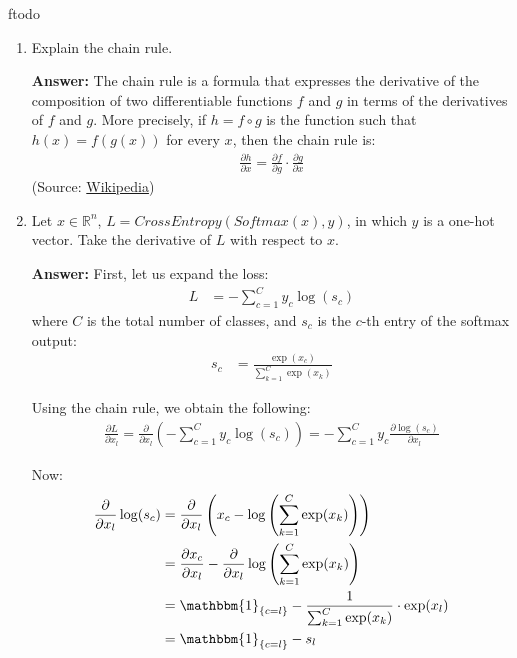 ƒtodo\documentclass{article}
\newenvironment{QandA}{\begin{enumerate}[label=\arabic*.]}{\end{enumerate}}
\newenvironment{answer}{\par\normalfont \textbf{Answer:}}{}
\newcommand{\R}{\mathbb{R}}
\newcommand{\Indicator}[1]{\mathbbm{1}_{\left\{ #1 \right\}}}
\begin{document}
\begin{QandA}
    \item Explain the chain rule.
    \begin{answer}
        The chain rule is a formula that expresses the derivative of the composition of two differentiable functions $f$ and $g$ in terms of the derivatives of $f$ and $g$. More precisely, if $h = f \circ g$ is the function such that $h(x) = f(g(x))$ for every $x$, then the chain rule is:
        \begin{align*}
            \frac{\partial h}{\partial x} = \frac{\partial f}{\partial g} \cdot \frac{\partial g}{\partial x}
        \end{align*}
        (Source: \href{https://en.wikipedia.org/wiki/Chain_rule}{Wikipedia})
    \end{answer}
    
    \item Let $x \in \R^n$, $L = CrossEntropy(Softmax(x), y)$, in which $y$ is a one-hot vector. Take the derivative of $L$ with respect to $x$.
    \begin{answer}
        First, let us expand the loss:
        \begin{align*}
            L &= - \sum_{c=1}^C y_c \log (s_c)
        \end{align*}
        where $C$ is the total number of classes, and $s_c$ is the $c$-th entry of the softmax output:
        \begin{align*}
            s_c &= \frac{\exp(x_c)}{\sum_{k=1}^C \exp(x_k)} 
        \end{align*}

        Using the chain rule, we obtain the following:
        \begin{align*}
            \frac{\partial L}{\partial x_l} = \frac{\partial}{\partial x_l} \left( - \sum_{c=1}^C y_c \log (s_c) \right) = - \sum_{c=1}^C y_c  \frac{\partial \log (s_c)}{\partial x_l}
        \end{align*}

        Now:
        \begin{align*}
            \frac{\partial}{\partial x_l} \log(s_c) &= \frac{\partial}{\partial x_l} \left( x_c - \log \left( \sum_{k=1}^C \exp(x_k) \right) \right) \\
            &= \frac{\partial x_c}{\partial x_l} - \frac{\partial}{\partial x_l} \log \left( \sum_{k=1}^C \exp(x_k) \right) \\
            &= \Indicator{c = l} - \frac{1}{\sum_{k=1}^C \exp(x_k)} \cdot \exp(x_l) \\
            &= \Indicator{c = l} - s_l
        \end{align*}


\end{answer}
\end{QandA}
\end{document}
